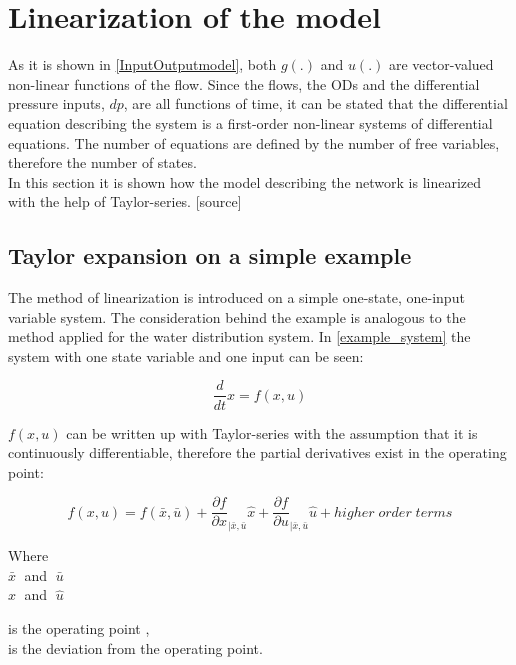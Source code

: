 \section{Linearization of the model} 
\label{LinParamEst}

As it is shown in \eqref{InputOutputmodel}, both $g(.)$ and $u(.)$ are vector-valued non-linear functions of the flow. Since the flows, the ODs and the differential pressure inputs, $dp$, are all functions of time, it can be stated that the differential equation describing the system is a first-order non-linear systems of differential equations. The number of equations are defined by the number of free variables, therefore the number of states.
\\
In this section it is shown how the model describing the network is linearized with the help of Taylor-series. [source] 

\subsection{Taylor expansion on a simple example}
 \label{Taylorexamplesection}

The method of linearization is introduced on a simple one-state, one-input variable system. The consideration behind the example is analogous to the method applied for the water distribution system. In \eqref{example_system} the system with one state variable and one input can be seen: 

\begin{equation}
\frac{d}{dt} x = f(x,u)
 \label{example_system}
\end{equation}

$f(x,u)$ can be written up with Taylor-series with the assumption that it is continuously differentiable, therefore the partial derivatives exist in the operating point: 

\begin{equation}
f(x,u) = f(\bar{x},\bar{u}) + \frac{\partial f}{\partial x}_{|\bar{x}, \bar{u}} \hat{x} + \frac{\partial f}{\partial u}_{|\bar{x}, \bar{u}} \hat{u} + higher \; order \; terms  
 \label{TaylorExpansion}
\end{equation}

\begin{minipage}[t]{0.20\textwidth}
Where\\
\hspace*{8mm} $\bar{x} \;$ and $\; \bar{u}$ \\
\hspace*{8mm} $\hat{x} \;$ and $\; \hat{u}$ 
\end{minipage}
\begin{minipage}[t]{0.68\textwidth}
\vspace*{2mm}
is the operating point ,\\
is the deviation from the operating point.
\end{minipage}

